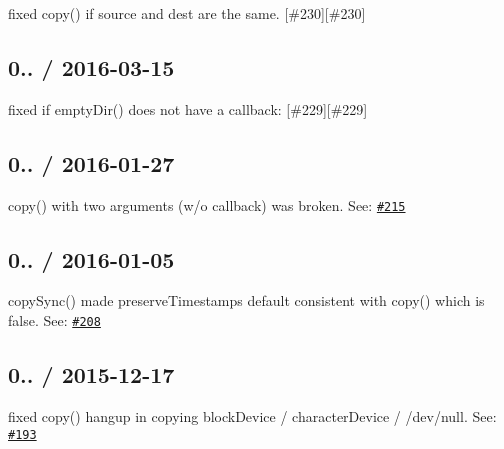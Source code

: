 
\begin{DoxyItemize}
\item fixed {\ttfamily copy()} if source and dest are the same. \mbox{[}\#230\mbox{]}\mbox{[}\#230\mbox{]}
\end{DoxyItemize}

\subsection*{0.. / 2016-\/03-\/15 }


\begin{DoxyItemize}
\item fixed if {\ttfamily empty\+Dir()} does not have a callback\+: \mbox{[}\#229\mbox{]}\mbox{[}\#229\mbox{]}
\end{DoxyItemize}

\subsection*{0.. / 2016-\/01-\/27 }


\begin{DoxyItemize}
\item {\ttfamily copy()} with two arguments (w/o callback) was broken. See\+: \href{https://github.com/jprichardson/node-fs-extra/pull/215}{\tt \#215}
\end{DoxyItemize}

\subsection*{0.. / 2016-\/01-\/05 }


\begin{DoxyItemize}
\item {\ttfamily copy\+Sync()} made {\ttfamily preserve\+Timestamps} default consistent with {\ttfamily copy()} which is {\ttfamily false}. See\+: \href{https://github.com/jprichardson/node-fs-extra/pull/208}{\tt \#208}
\end{DoxyItemize}

\subsection*{0.. / 2015-\/12-\/17 }


\begin{DoxyItemize}
\item fixed {\ttfamily copy()} hangup in copying block\+Device / character\+Device / {\ttfamily /dev/null}. See\+: \href{https://github.com/jprichardson/node-fs-extra/issues/193}{\tt \#193}
\end{DoxyItemize}

